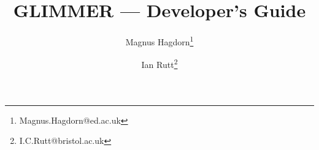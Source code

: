 \newcommand{\dir}{dg}

\pagestyle{myheadings}


\title{GLIMMER {\glimmerver} --- Developer's Guide}
\author{Magnus Hagdorn\thanks{Magnus.Hagdorn@ed.ac.uk} \and Ian Rutt\thanks{I.C.Rutt@bristol.ac.uk}}
\maketitle
\tableofcontents
\newpage



